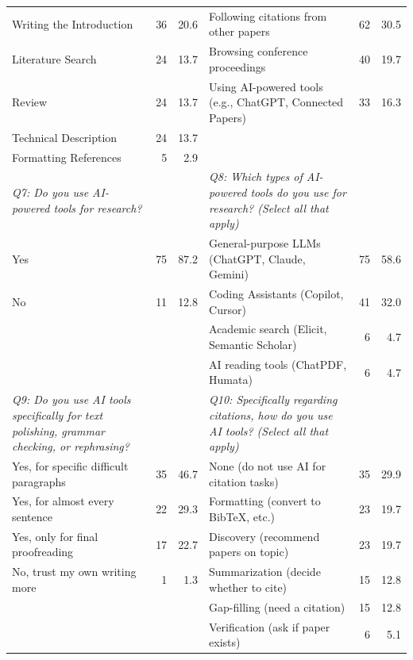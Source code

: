 \begin{table}[htbp]
\begin{tabular}{p{6cm}rr|p{6cm}rr}
Writing the Introduction & 36 & 20.6 & Following citations from other papers & 62 & 30.5 \\
\rowcolor{tableRowLight}
Literature Search & 24 & 13.7 & Browsing conference proceedings & 40 & 19.7 \\
Review & 24 & 13.7 & Using AI-powered tools (e.g., ChatGPT, Connected Papers) & 33 & 16.3 \\
\rowcolor{tableRowLight}
Technical Description & 24 & 13.7 &  &  &  \\
Formatting References & 5 & 2.9 &  &  &  \\
\midrule
\textit{Q7: Do you use AI-powered tools for research?} & & & \textit{Q8: Which types of AI-powered tools do you use for research? (Select all that apply)} & & \\
\rowcolor{tableRowLight}
Yes & 75 & 87.2 & General-purpose LLMs (ChatGPT, Claude, Gemini) & 75 & 58.6 \\
No & 11 & 12.8 & Coding Assistants (Copilot, Cursor) & 41 & 32.0 \\
\rowcolor{tableRowLight}
 &  &  & Academic search (Elicit, Semantic Scholar) & 6 & 4.7 \\
 &  &  & AI reading tools (ChatPDF, Humata) & 6 & 4.7 \\
\midrule
\textit{Q9: Do you use AI tools specifically for text polishing, grammar checking, or rephrasing?} & & & \textit{Q10: Specifically regarding citations, how do you use AI tools? (Select all that apply)} & & \\
\rowcolor{tableRowLight}
Yes, for specific difficult paragraphs & 35 & 46.7 & None (do not use AI for citation tasks) & 35 & 29.9 \\
Yes, for almost every sentence & 22 & 29.3 & Formatting (convert to BibTeX, etc.) & 23 & 19.7 \\
\rowcolor{tableRowLight}
Yes, only for final proofreading & 17 & 22.7 & Discovery (recommend papers on topic) & 23 & 19.7 \\
No, trust my own writing more & 1 & 1.3 & Summarization (decide whether to cite) & 15 & 12.8 \\
\rowcolor{tableRowLight}
 &  &  & Gap-filling (need a citation) & 15 & 12.8 \\
 &  &  & Verification (ask if paper exists) & 6 & 5.1 \\
\bottomrule
\end{tabular}
\end{table}

